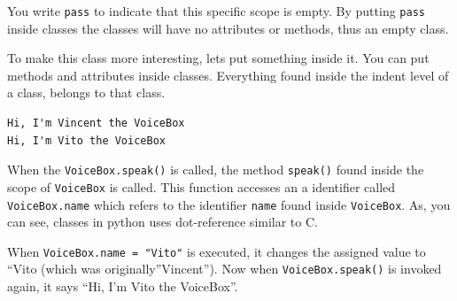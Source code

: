 \begin{Shaded}
\begin{Highlighting}[]
\end{Highlighting}
\end{Shaded}

You write \texttt{pass} to indicate that this specific scope is empty.
By putting \texttt{pass} inside classes the classes will have no
attributes or methods, thus an empty class.

To make this class more interesting, lets put something inside it. You
can put methods and attributes inside classes. Everything found inside
the indent level of a class, belongs to that class.

\begin{Shaded}
\begin{Highlighting}[]


 \OperatorTok{=} 
        \NormalTok{(} \OperatorTok{+}\OperatorTok{+} \NormalTok{)}

\OperatorTok{=} 
\end{Highlighting}
\end{Shaded}

\begin{verbatim}
Hi, I'm Vincent the VoiceBox
Hi, I'm Vito the VoiceBox
\end{verbatim}

When the \texttt{VoiceBox.speak()} is called, the method
\texttt{speak()} found inside the scope of \texttt{VoiceBox} is called.
This function accesses an a identifier called \texttt{VoiceBox.name}
which refers to the identifier \texttt{name} found inside
\texttt{VoiceBox}. As, you can see, classes in python uses dot-reference
similar to C.

When \texttt{VoiceBox.name\ =\ "Vito"} is executed, it changes the
assigned value to ``Vito (which was originally''Vincent''). Now when
\texttt{VoiceBox.speak()} is invoked again, it says ``Hi, I'm Vito the
VoiceBox''.

